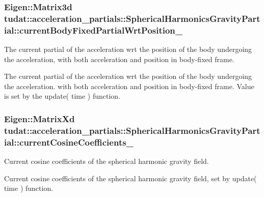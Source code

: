 \subsubsection[{\texorpdfstring{current\+Body\+Fixed\+Partial\+Wrt\+Position\+\_\+}{currentBodyFixedPartialWrtPosition_}}]{\setlength{\rightskip}{0pt plus 5cm}Eigen\+::\+Matrix3d tudat\+::acceleration\+\_\+partials\+::\+Spherical\+Harmonics\+Gravity\+Partial\+::current\+Body\+Fixed\+Partial\+Wrt\+Position\+\_\+\hspace{0.3cm}{\ttfamily [protected]}}\hypertarget{classtudat_1_1acceleration__partials_1_1SphericalHarmonicsGravityPartial_a7a9f8f2be401442d321d9d16ea677beb}{}\label{classtudat_1_1acceleration__partials_1_1SphericalHarmonicsGravityPartial_a7a9f8f2be401442d321d9d16ea677beb}
The current partial of the acceleration wrt the position of the body undergoing the acceleration, with both acceleration and position in body-\/fixed frame.

The current partial of the acceleration wrt the position of the body undergoing the acceleration. with both acceleration and position in body-\/fixed frame. Value is set by the update( time ) function. 
\subsubsection[{\texorpdfstring{current\+Cosine\+Coefficients\+\_\+}{currentCosineCoefficients_}}]{\setlength{\rightskip}{0pt plus 5cm}Eigen\+::\+Matrix\+Xd tudat\+::acceleration\+\_\+partials\+::\+Spherical\+Harmonics\+Gravity\+Partial\+::current\+Cosine\+Coefficients\+\_\+\hspace{0.3cm}{\ttfamily [protected]}}\hypertarget{classtudat_1_1acceleration__partials_1_1SphericalHarmonicsGravityPartial_a5cf1f88dd030daa8efe9caeb7fae3cd9}{}\label{classtudat_1_1acceleration__partials_1_1SphericalHarmonicsGravityPartial_a5cf1f88dd030daa8efe9caeb7fae3cd9}


Current cosine coefficients of the spherical harmonic gravity field. 

Current cosine coefficients of the spherical harmonic gravity field, set by update( time ) function. 
